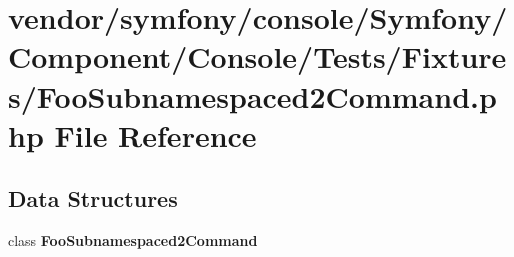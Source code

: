 \section{vendor/symfony/console/\+Symfony/\+Component/\+Console/\+Tests/\+Fixtures/\+Foo\+Subnamespaced2\+Command.php File Reference}
\label{_foo_subnamespaced2_command_8php}
\subsection*{Data Structures}
\begin{DoxyCompactItemize}
\item 
class {\bf Foo\+Subnamespaced2\+Command}
\end{DoxyCompactItemize}
